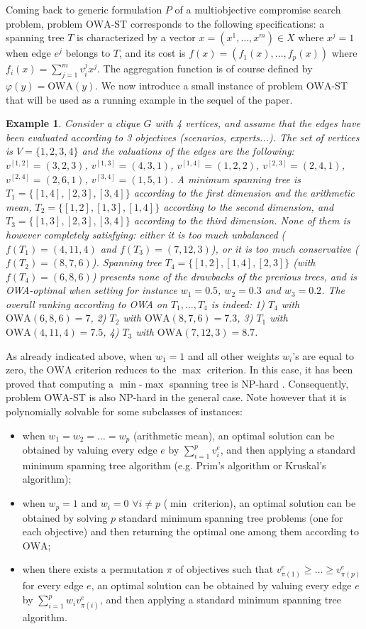\documentclass[final,3p,times]{elsarticle}
\newcommand{\owa}{\mbox{OWA}}
\newcommand{\vij}{v_{i}^{j}}
\newcommand{\ej}{e^{j}}
\newtheorem{example}{Example}
\begin{document}
Coming back to generic formulation $P$ of a multiobjective compromise search problem, problem $\owa$-ST corresponds to the following specifications: a spanning tree $T$ is characterized by a vector $x=(x^1,\ldots,x^m) \in X$ where $x^j = 1$ when edge $\ej$ belongs to $T$, and its cost is $f(x) = (f_1(x),\ldots,f_p(x))$ where $f_i(x) = \sum_{j=1}^m \vij x^j$. The aggregation function is
of course defined by $\varphi(y) = \owa(y)$. 
We now introduce a small instance of problem $\owa$-ST that will be used as a running example in the sequel of the paper.
\begin{example} \label{EXP1}
Consider a clique $G$ with 4 vertices, and assume that the edges have been evaluated according to 3 objectives (scenarios, experts...). The set of vertices is $V = \{1,2,3,4\}$ and the valuations of the edges are the following: $v^{[1,2]} = (3,2,3)$, $v^{[1,3]} = (4,3,1)$, $v^{[1,4]} = (1,2,2)$, $v^{[2,3]} = (2,4,1)$, $v^{[2,4]} = (2,6,1)$, $v^{[3,4]} = (1,5,1)$. A minimum spanning tree is $T_1 = \{[1,4],[2,3],[3,4]\}$ according to the first dimension and the arithmetic mean, $T_2 = \{[1,2],[1,3],[1,4]\}$ according to the second dimension, and $T_3 = \{[1,3],[2,3],[3,4]\}$ according to the third dimension. None of them is however completely satisfying: either it is too much unbalanced ($f(T_1) = (4,11,4)$ and $f(T_3) = (7,12,3)$), or it is too much conservative ($f(T_2) = (8,7,6)$). Spanning tree $T_4 = \{[1,2],[1,4],[2,3]\}$ (with $f(T_4) = (6,8,6)$) presents none of the drawbacks of the previous trees, and is OWA-optimal when setting for instance $w_1 = 0.5$, $w_2 = 0.3$ and $w_3 = 0.2$. The overall ranking according to OWA on $T_1, \ldots, T_4$ is indeed: 1) $T_4$  with $\owa(6,8,6) = 7$, 2) $T_2$ with $\owa(8,7,6) = 7.3$, 3) $T_1$ with $\owa(4,11,4) = 7.5$, 4) $T_3$ with $\owa(7,12,3) = 8.7$. 
\end{example}
As already indicated above, when $w_1 = 1$ and all other weights $w_i$'s are equal to zero, the $\owa$ criterion reduces to the $\max$ criterion. In this case, it has been proved that computing a $\min$-$\max$ spanning tree is NP-hard \cite{HamaR94,Yu98}. Consequently, problem $\owa$-ST is also NP-hard in the general case. Note however that it is polynomially solvable for some subclasses of instances:
\begin{itemize}
\item when $w_1 = w_2 = \ldots = w_p$ (arithmetic mean), an optimal solution can be obtained by valuing every edge $e$ by $\sum_{i=1}^p v_i^e$, and then applying a standard minimum spanning tree algorithm (e.g. Prim's algorithm or Kruskal's algorithm);
\item when $w_p=1$ and $w_i=0$ $\forall i \neq p$ ($\min$ criterion), an optimal solution can be obtained by solving $p$ standard minimum spanning tree problems (one for each objective) and then returning the optimal one among them according to $\owa$; 
\item when there exists a permutation $\pi$ of objectives such that $v_{\pi(1)}^e \geq \ldots \geq v_{\pi(p)}^e$ for every edge $e$, an optimal solution can be obtained by valuing every edge $e$ by $\sum_{i=1}^p w_i v_{\pi(i)}^e$, and then applying a standard minimum spanning tree algorithm.
\end{itemize}
\end{document}
